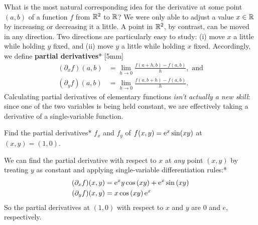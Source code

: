 \documentclass[prettycode,shellescape]{watsonbook}
\begin{document}
What is the most natural corresponding idea for the derivative at some
point $(a,b)$ of a function $f$ from $\mathbb{R}^2$ to $\mathbb{R}$? We were only able
to adjust a value $x\in \mathbb{R}$ by increasing or decreasing it a little. A
point in $\mathbb{R}^2$, by contrast, can be moved in any direction. Two
directions are particularly easy to study: (i) move $x$ a little while
holding $y$ fixed, and (ii) move $y$ a little while holding $x$
fixed. Accordingly, we define \textbf{partial derivatives}*
[5mm]
\begin{align*}
  (\partial_x f)(a,b) &= \lim_{h \to 0}\frac{f(a+h,b) - f(a,b)}{h},
                        \text{ and} \\
  (\partial_y f)(a,b) &= \lim_{h \to 0}\frac{f(a,b+h) - f(a,b)}{h}. 
\end{align*}
Calculating partial derivatives of elementary functions \textit{isn't
  actually a new skill}: since one of the two
variables is being held constant, we are effectively taking a
derivative of a single-variable function.

\begin{example}{}{}
  Find the partial derivatives* $f_x$ and $f_y$ of
  $f(x,y) = \mathrm{e}^x \sin (xy)$ at $(x,y) = (1,0)$. 
\end{example}

\begin{solution}
  We can find the partial derivative with respect to $x$ at
  \textit{any} point $(x,y)$ by treating $y$ as constant and applying
  single-variable differentiation rules:* 
  \begin{align*}
    (\partial_xf)(x,y) &= \mathrm{e}^{x} y \cos\left(x y\right) + \mathrm{e}^{x}
                         \sin\left(x y\right) \\  
    (\partial_yf)(x,y)  &= x \cos\left(x y\right) \mathrm{e}^{x}
  \end{align*}
  So the partial derivatives at $(1,0)$ with respect to $x$ and $y$
  are 0 and $e$, respectively.
\end{solution}
\end{document}
